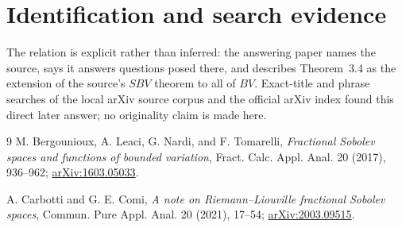 \documentclass[10pt]{article}
\begin{document}
\section*{Identification and search evidence}
The relation is explicit rather than inferred: the answering paper names the
source, says it answers questions posed there, and describes Theorem~3.4 as
the extension of the source's $SBV$ theorem to all of $BV$.  Exact-title and
phrase searches of the local arXiv source corpus and the official arXiv index
found this direct later answer; no originality claim is made here.

\begin{thebibliography}{9}
M. Bergounioux, A. Leaci, G. Nardi, and F. Tomarelli,
\emph{Fractional Sobolev spaces and functions of bounded variation},
Fract. Calc. Appl. Anal. 20 (2017), 936--962;
\href{https://arxiv.org/abs/1603.05033}{arXiv:1603.05033}.

A. Carbotti and G. E. Comi,
\emph{A note on Riemann--Liouville fractional Sobolev spaces},
Commun. Pure Appl. Anal. 20 (2021), 17--54;
\href{https://arxiv.org/abs/2003.09515}{arXiv:2003.09515}.
\end{thebibliography}
\end{document}

